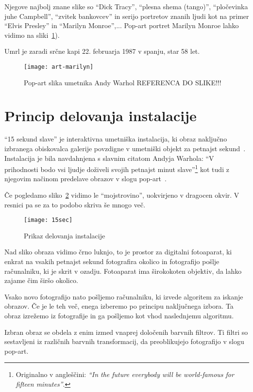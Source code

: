 Njegove najbolj znane slike so ``Dick Tracy'', ``plesna shema (tango)'',
``pločevinka juhe Campbell'', ``zvitek bankovcev'' in serijo portretov znanih
ljudi kot na primer ``Elvis Presley'' in ``Marilyn Monroe'',... Pop-art
portret Marilyn Monroe lahko vidimo na sliki~\ref{fig:art-marilyn}).

Umrl je zaradi srčne kapi 22. februarja 1987 v spanju, star 58 let.

\begin{figure}[!ht]
    \centering
    \texttt{[image: art-marilyn]}
    \caption{Pop-art slika umetnika Andy Warhol REFERENCA DO SLIKE!!!}
    \label{fig:art-marilyn}
\end{figure}

\section{Princip delovanja instalacije}
``15 sekund slave'' je interaktivna umetniška instalacija, ki obraz naključno
izbranega obiskovalca galerije povzdigne v umetniški objekt za petnajst
sekund~\cite{leonardo}. Instalacija je bila navdahnjena s slavnim citatom
Andyja Warhola: ``V prihodnosti bodo vsi ljudje doživeli svojih petnajst minut
slave''\footnote{Originalno v angleščini: \textit{``In the future everybody
will be world-famous for fifteen minutes''}\cite{andyExhibition}.} kot tudi z
njegovim načinom predelave obrazov v slogu pop-art~\cite{solina200215}.

Če pogledamo sliko~\ref{fig:15sec} vidimo le ``mojstrovino'', uokvirjeno v
dragocen okvir. V resnici pa se za to podobo skriva še mnogo več.

\begin{figure}
    \centering
    \texttt{[image: 15sec]}
    \caption{Prikaz delovanja instalacije}
    \label{fig:15sec}
\end{figure}

Nad sliko obraza vidimo črno luknjo, to je prostor za digitalni fotoaparat, ki
enkrat na vsakih petnajst sekund fotografira okolico in fotografijo pošlje
računalniku, ki je skrit v ozadju. Fotoaparat ima širokokoten objektiv, da
lahko zajame čim širšo okolico.

Vsako novo fotografijo nato pošljemo računalniku, ki izvede algoritem za
iskanje obrazov. Če je le teh več, enega izberemo po principu naključnega
izbora. Ta obraz izrežemo iz fotografije in ga pošljemo kot vhod
naslednjemu algoritmu.

Izbran obraz se obdela z enim izmed vnaprej določenih barvnih filtrov. Ti
filtri so sestavljeni iz različnih barvnih transformacij, da preoblikujejo
fotografijo v slogu pop-art. 

